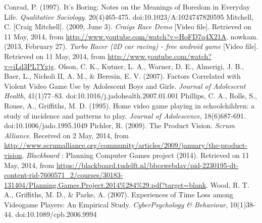 \documentclass[11pt,twoside,a4paper]{article}
\begin{document}
Conrad, P. (1997). It's Boring: Notes on the Meanings of Boredom in Everyday Life. \textit{Qualitative Sociology}. 20(4)465-475. doi:10.1023/A:1024747820595
\newline \newline
Mitchell, C. [Craig Mitchell]. (2009, June 3). \textit{Craigs Race Demo} [Video file]. Retrieved on 11 May, 2014, from \url{http://www.youtube.com/watch?v=HoFD7q4X21A}.
\newline \newline
nowkam. (2013, February 27). \textit{Turbo Racer (2D car racing) - free android game} [Video file]. Retrieved on 11 May, 2014, from \url{http://www.youtube.com/watch?v=iLd3PL7Yxjg}.
\newline \newline
Olson, C. K., Kutner, L. A., Warner, D. E., Almerigi, J. B., Baer, L., Nicholi II, A. M., \& Beresin, E. V. (2007). Factors Correlated with Violent Video Game Use by Adolescent Boys and Girls. \textit{Journal of Adolescent Health}, 41(1)77–83. doi:10.1016/j.jadohealth.2007.01.001
\newline \newline
Phillips, C. A., Rolls, S., Rouse, A., Griffiths, M. D. (1995). Home video game playing in schoolchildren: a study of incidence and patterns to play. \textit{Journal of Adolescence}, 18(6)687-691. doi:10.1006/jado.1995.1049
\newline \newline
Pichler, R. (2009). The Product Vision. \textit{Scrum Alliance}. Received on 2 May, 2014, from \url{http://www.scrumalliance.org/community/articles/2009/january/the-product-vision}.
\newline \newline
\textit{Blackboard} : Planning Computer Games project (2014). Retrieved on 11 May, 2014, from \url{https://blackboard.tudelft.nl/bbcswebdav/pid-2230195-dt-content-rid-7600571_2/courses/30183-131404/Planning.Games.Project.2014%284%29.pdf?target=blank}.
\newline \newline
Wood, R. T. A., Griffiths, M. D., \& Parke, A. (2007). Experiences of Time Loss among Videogame Players: An Empirical Study. \textit{CyberPsychology \& Behaviour}, 10(1)38-44. doi:10.1089/cpb.2006.9994
\end{document}
